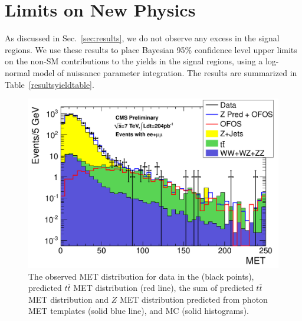 \section{Limits on New Physics}
\label{sec:limit}

As discussed in Sec.~\ref{sec:results}, we do not observe any excess in the signal regions.
We use these results to place Bayesian 95\% confidence level upper limits~\cite{ref:cl95cms} on 
the non-SM contributions to the yields in the signal regions, using a log-normal model
of nuissance parameter integration. The results are summarized in Table~\ref{resultsyieldtable}.  

\begin{figure}[hbt]
\begin{center}
\includegraphics[width=0.78\linewidth]{plots/lep_metPredicted.pdf}
\caption{\label{fig:results}\protect 
  The observed MET distribution for data in the (black points),
  predicted $t\bar{t}$ MET distribution (red line), the sum of predicted %
  $t\bar{t}$ MET distribution and
  $Z$  MET  distribution  predicted  from photon  MET  templates
  (solid blue line),  and MC (solid histograms). 
  }
\end{center}
\end{figure}

